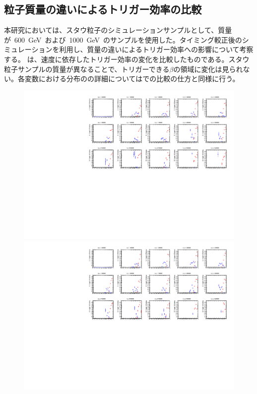 \subsection{粒子質量の違いによるトリガー効率の比較}\label{sec:trimass}
本研究においては、スタウ粒子のシミュレーションサンプルとして、質量が~600~GeV~および~1000~GeV~のサンプルを使用した。タイミング較正後のシミュレーションを利用し、質量の違いによるトリガー効率への影響について考察する。
は、速度に依存したトリガー効率の変化を比較したものである。スタウ粒子サンプルの質量が異なることで、トリガーできる$\beta$の領域に変化は見られない。各変数における分布のの詳細についてはでの比較の仕方と同様に行う。
\begin{figure}[tbp]
    \begin{minipage}{0.49\hsize}
    \centering   
    \includegraphics[width=\textwidth,page=2]{img/rec/stau_600.pdf}
    \subcaption{}
    \end{minipage}
    \begin{minipage}{0.49\hsize}
    \centering   
    \includegraphics[width=\textwidth,page=2]{img/rec/stau_1000.pdf}

\end{minipage}
\end{figure}
